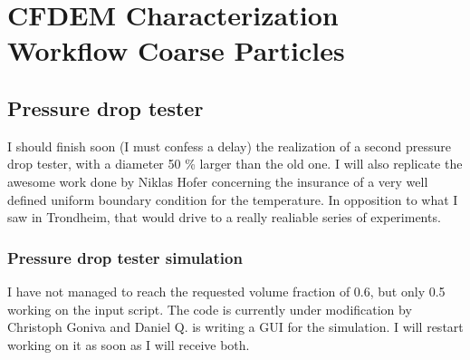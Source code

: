 
\section{CFDEM Characterization Workflow Coarse Particles}
\label{section:CFDemcharacterizationworkflowcoarseparticles}

\subsection{Pressure drop tester}
\label{subsection:pressuredroptester}

I should finish soon (I must confess a delay) the realization of a second pressure drop tester, with a diameter 50 \% larger than the old one.
I will also replicate the awesome work done by Niklas Hofer concerning the insurance of a very well defined uniform boundary condition for the temperature.
In opposition to what I saw in Trondheim, that would drive to a really realiable series of experiments.\\

\subsubsection{Pressure drop tester simulation}
\label{subsubsection:pressuredroptestersimulation}

I have not managed to reach the requested volume fraction of 0.6, but only 0.5 working on the input script. The code is currently under modification by Christoph Goniva and Daniel Q. is writing a GUI for the simulation.
I will restart working on it as soon as I will receive both.\\

